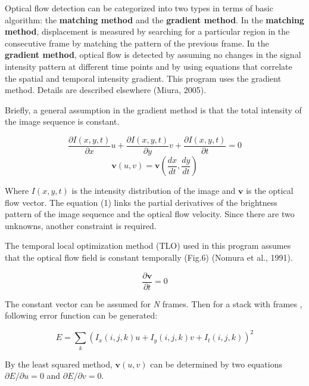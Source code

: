 \documentclass{article}
\begin{document}
Optical flow detection can be categorized into two types in terms of
basic algorithm: the \textbf{matching method} and the \textbf{gradient
method}. In the \textbf{matching method}, displacement is measured by
searching for a particular region in the consecutive frame by matching
the pattern of the previous frame. In the \textbf{gradient method},
optical flow is detected by assuming no changes in the signal intensity
pattern at different time points and by using equations that correlate
the spatial and temporal intensity gradient. This program uses the
gradient method. Details are described elsewhere (Miura, 2005).

Briefly, a general assumption in the gradient method is that the total
intensity of the image sequence is constant.

\begin{equation}
\frac{\partial I(x, y, t)}{\partial x}u + \frac{\partial I(x, y, t)}{\partial y}v + \frac{\partial I(x, y, t)}{\partial t} = 0
\end{equation}
\begin{equation}
\mathbf{v}(u,v)= \mathbf{v}(\frac{dx}{dt},\frac{dy}{dt})
\end{equation}



Where \(I(x,y,t)\) is the intensity distribution of the image and
\(\mathbf{v}\) is the optical flow vector. The equation (1) links the
partial derivatives of the brightness pattern of the image sequence and
the optical flow velocity. Since there are two unknowns, another
constraint is required.

The temporal local optimization method (TLO) used in this program
assumes that the optical flow field is constant temporally (Fig.6)
(Nomura et al., 1991).

\begin{equation}
  \frac{\partial \mathbf{v}}{\partial t} = 0
\end{equation}

The constant vector can be assumed for \emph{N} frames. Then for a stack
with frames , following error function can be generated:

\begin{equation}
  E = \sum_k(I_x(i, j, k)u+I_y(i, j, k)v + I_t(i, j, k))^2
\end{equation}

By the least squared method, \(\mathbf{v}(u,v)\) can be determined by
two equations \(\partial E / \partial u = 0\) and
\(\partial E / \partial v = 0\).
\end{document}
